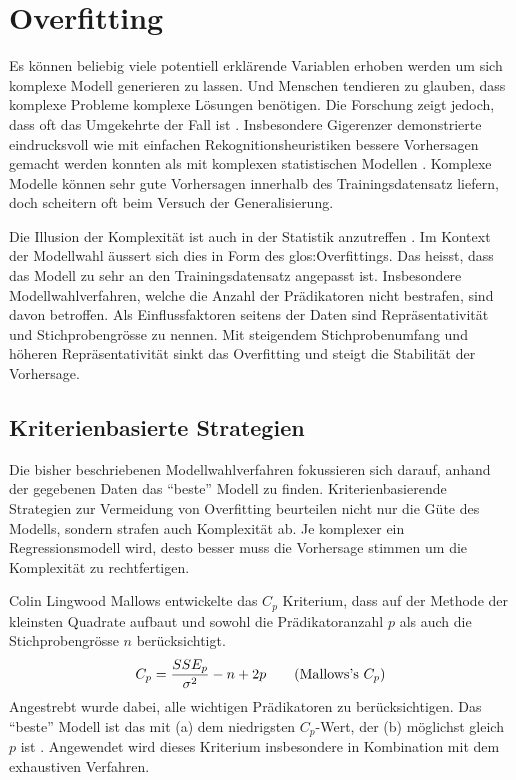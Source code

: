 \section{Overfitting}
Es können beliebig viele potentiell erklärende Variablen erhoben werden um sich komplexe Modell generieren zu lassen. 
Und Menschen tendieren zu glauben, dass komplexe Probleme komplexe Lösungen benötigen. 
Die Forschung zeigt jedoch, dass oft das Umgekehrte der Fall ist \cite[p.3]{armstrong2011illusions}. 
Insbesondere Gigerenzer demonstrierte eindrucksvoll wie mit einfachen Rekognitionsheuristiken bessere Vorhersagen gemacht werden konnten als mit komplexen statistischen Modellen \cite{borges1999can}.
Komplexe Modelle können sehr gute Vorhersagen innerhalb des Trainingsdatensatz liefern, doch  scheitern oft beim Versuch der Generalisierung.  

Die Illusion der Komplexität ist auch in der Statistik anzutreffen \cite[p. 3]{armstrong2011illusions}. 
Im Kontext der Modellwahl äussert sich dies in Form des  \Gls{glos:Overfitting}s. Das heisst, dass das Modell zu sehr an den Trainingsdatensatz angepasst ist.
Insbesondere Modellwahlverfahren, welche die Anzahl der Prädikatoren nicht bestrafen, sind davon betroffen.
Als Einflussfaktoren seitens der Daten sind Repräsentativität und Stichprobengrösse zu nennen. 
Mit steigendem Stichprobenumfang und höheren Repräsentativität sinkt das Overfitting und steigt die Stabilität der Vorhersage.

\subsection{Kriterienbasierte Strategien}
Die bisher beschriebenen Modellwahlverfahren fokussieren sich darauf, anhand der gegebenen Daten das ``beste'' Modell zu finden.
Kriterienbasierende Strategien zur Vermeidung von Overfitting beurteilen nicht nur die Güte des Modells, sondern strafen auch Komplexität ab.
Je komplexer ein Regressionsmodell wird, desto besser muss die Vorhersage stimmen um die Komplexität zu rechtfertigen.

Colin Lingwood Mallows entwickelte das $C_p$ Kriterium, dass auf der Methode der kleinsten Quadrate  aufbaut und sowohl die Prädikatoranzahl $p$ als auch die Stichprobengrösse $n$ berücksichtigt. 
\begin{equation}
C_p={SSE_p \over \sigma^2} - n + 2p
\tag{Mallows's $C_p$}
\end{equation}
Angestrebt wurde dabei, alle wichtigen Prädikatoren zu berücksichtigen. 
Das ``beste'' Modell ist das mit (a) dem niedrigsten $C_p$-Wert, der (b) möglichst gleich $p$ ist \cite{gilmour1996interpretation}. Angewendet wird dieses Kriterium insbesondere in Kombination mit dem exhaustiven Verfahren.

